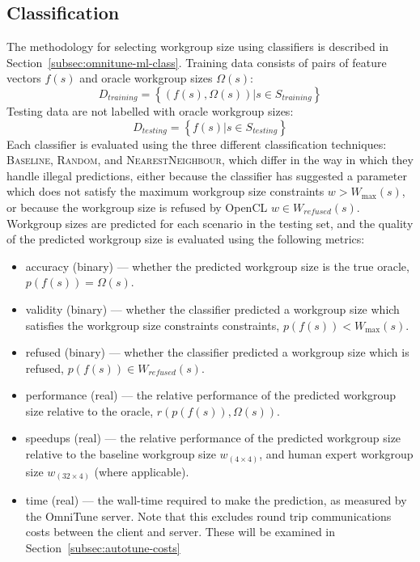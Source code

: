 \subsection{Classification}

The methodology for selecting workgroup size using classifiers is
described in Section~\ref{subsec:omnitune-ml-class}. Training data
consists of pairs of feature vectors $f(s)$ and oracle workgroup sizes
$\Omega(s)$:
%
\begin{equation}
  D_{training} = \left\{ (f(s),\Omega(s)) | s \in S_{training} \right\}
\end{equation}
%
Testing data are not labelled with oracle workgroup sizes:
%
\begin{equation}
  D_{testing} = \left\{ f(s) | s \in S_{testing} \right\}
\end{equation}
%
Each classifier is evaluated using the three different classification
techniques: \textsc{Baseline}, \textsc{Random}, and
\textsc{NearestNeighbour}, which differ in the way in which they
handle illegal predictions, either because the classifier has
suggested a parameter which does not satisfy the maximum workgroup
size constraints $w > W_{\max}(s)$, or because the workgroup size is
refused by OpenCL $w \in W_{refused}(s)$. Workgroup sizes are
predicted for each scenario in the testing set, and the quality of the
predicted workgroup size is evaluated using the following metrics:

\begin{itemize}
\item accuracy (binary) --- whether the predicted workgroup size is the
  true oracle, $p(f(s)) = \Omega(s)$.
\item validity (binary) --- whether the classifier predicted a workgroup
  size which satisfies the workgroup size constraints constraints,
  $p(f(s)) < W_{\max}(s)$.
\item refused (binary) --- whether the classifier predicted a workgroup
  size which is refused, $p(f(s)) \in W_{refused}(s)$.
\item performance (real) --- the relative performance of the predicted
  workgroup size relative to the oracle, $r(p(f(s)), \Omega(s))$.
\item speedups (real) --- the relative performance of the predicted
  workgroup size relative to the baseline workgroup size
  $w_{(4 \times 4)}$, and human expert workgroup size
  $w_{(32 \times 4)}$ (where applicable).
\item time (real) --- the wall-time required to make the prediction,
  as measured by the OmniTune server. Note that this excludes round
  trip communications costs between the client and server. These will
  be examined in Section~\ref{subsec:autotune-costs}
\end{itemize}


